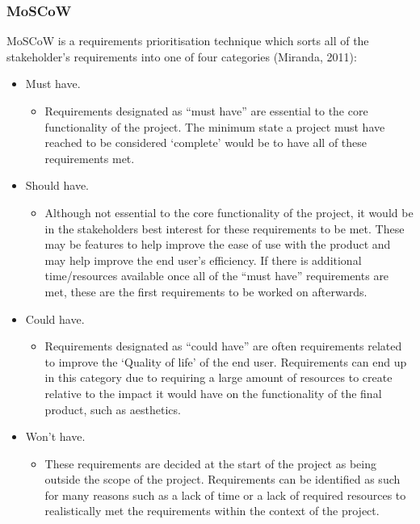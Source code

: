 \documentclass[12pt,a4paper]{article}
\begin{document}
\subsubsection{MoSCoW}

MoSCoW is a requirements prioritisation technique which sorts all of the stakeholder's requirements into one of four categories (Miranda, 2011):

\begin{itemize}
    \item Must have.
    \begin{itemize}
        \item Requirements designated as ``must have'' are essential to the core functionality of the project. The minimum state a project must have reached to be considered `complete' would be to have all of these requirements met.
    \end{itemize}
    \item Should have.
    \begin{itemize}
        \item Although not essential to the core functionality of the project, it would be in the stakeholders best interest for these requirements to be met. These may be features to help improve the ease of use with the product and may help improve the end user's efficiency. If there is additional time/resources available once all of the ``must have'' requirements are met, these are the first requirements to be worked on afterwards.
    \end{itemize}
    \item Could have.
    \begin{itemize}
        \item Requirements designated as ``could have'' are often requirements related to improve the `Quality of life' of the end user. Requirements can end up in this category due to requiring a large amount of resources to create relative to the impact it would have on the functionality of the final product, such as aesthetics.
    \end{itemize}
    \item Won't have.
    \begin{itemize}
        \item These requirements are decided at the start of the project as being outside the scope of the project. Requirements can be identified as such for many reasons such as a lack of time or a lack of required resources to realistically met the requirements within the context of the project.
    \end{itemize}
\end{itemize}
\end{document}
